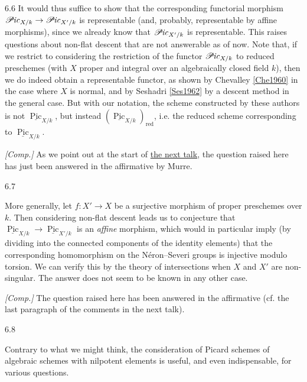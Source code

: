 \begin{remark}{6.6}
    It would thus suffice to show that the corresponding functorial morphism \(\mathscr {P}\kern  -1pt\mathit {ic}_{X/k}\to \mathscr {P}\kern  -1pt\mathit {ic}_{X'/k}\) is representable (and, probably, representable by affine morphisms), since we already know that \(\mathscr {P}\kern  -1pt\mathit {ic}_{X'/k}\) is representable.
    This raises questions about non-flat descent that are not answerable as of now.
    Note that, if we restrict to considering the restriction of the functor \(\mathscr {P}\kern  -1pt\mathit {ic}_{X/k}\) to reduced preschemes (with \(X\) proper and integral over an algebraically closed field \(k\)), then we do indeed obtain a representable functor, as shown by Chevalley \hyperref[Che1960]{[Che1960]} in the case where \(X\) is normal, and by Seshadri \hyperref[Ses1962]{[Ses1962]} by a descent method in the general case.
    But with our notation, the scheme constructed by these authors is not \(\underline {\operatorname {Pic}}_{X/k}\), but instead \((\underline {\operatorname {Pic}}_{X/k})_\mathrm {red}\), i.e. the reduced scheme corresponding to \(\underline {\operatorname {Pic}}_{X/k}\).\par{}\emph{[Comp.]}
    As we point out at the start of \hyperref[fga3.vi]{the next talk}, the question raised here has just been answered in the affirmative by Murre.\end{remark}\begin{remark}{6.7}\label{fga3.v-6-remark-6.7}\skipsinglepar\par{}More generally, let \(f\colon  X'\to  X\) be a surjective morphism of proper preschemes over \(k\).
    Then considering non-flat descent leads us to conjecture that \(\underline {\operatorname {Pic}}_{X/k}\to \underline {\operatorname {Pic}}_{X'/k}\) is an \emph{affine} morphism, which would in particular imply (by dividing into the connected components of the identity elements) that the corresponding homomorphism on the Néron–Severi groups is injective modulo torsion.
    We can verify this by the theory of intersections when \(X\) and \(X'\) are non-singular.
    The answer does not seem to be known in any other case.\par{}\emph{[Comp.]}
    The question raised here has been answered in the affirmative (cf. the last paragraph of the comments in the next talk).\end{remark}\begin{remark}{6.8}\label{fga3.v-6-remark-6.8}\skipsinglepar\par{}Contrary to what we might think, the consideration of Picard schemes of algebraic schemes with nilpotent elements is useful, and even indispensable, for various questions.

\end{remark}
